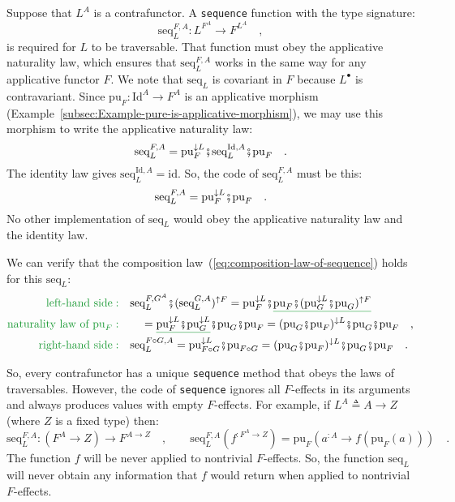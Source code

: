 Suppose that $L^{A}$ is a contrafunctor. A \lstinline!sequence!
function with the type signature:
\[
\text{seq}_{L}^{F,A}:L^{F^{A}}\rightarrow F^{L^{A}}\quad,
\]
is required for $L$ to be traversable. That function must obey the
applicative naturality law, which ensures that $\text{seq}_{L}^{F,A}$
works in the same way for any applicative functor $F$. We note that
$\text{seq}_{L}$ is covariant in $F$ because $L^{\bullet}$ is contravariant.
Since $\text{pu}_{F}:\text{Id}^{A}\rightarrow F^{A}$ is an applicative
morphism (Example~\ref{subsec:Example-pure-is-applicative-morphism}),
we may use this morphism to write the applicative naturality law:
\[
\text{seq}_{L}^{F,A}=\text{pu}_{F}^{\downarrow L}\bef\text{seq}_{L}^{\text{Id},A}\bef\text{pu}_{F}\quad.
\]
The identity law gives $\text{seq}_{L}^{\text{Id},A}=\text{id}$.
So, the code of $\text{seq}_{L}^{F,A}$ must be this:
\[
\text{seq}_{L}^{F,A}=\text{pu}_{F}^{\downarrow L}\bef\text{pu}_{F}\quad.
\]
No other implementation of $\text{seq}_{L}$ would obey the applicative
naturality law and the identity law.

We can verify that the composition law~(\ref{eq:composition-law-of-sequence})
holds for this $\text{seq}_{L}$:
\begin{align*}
{\color{greenunder}\text{left-hand side}:}\quad & \text{seq}_{L}^{F,G^{A}}\bef(\text{seq}_{L}^{G,A})^{\uparrow F}=\text{pu}_{F}^{\downarrow L}\bef\gunderline{\text{pu}_{F}\bef(\text{pu}_{G}^{\downarrow L}\bef\text{pu}_{G})^{\uparrow F}}\\
{\color{greenunder}\text{naturality law of }\text{pu}_{F}:}\quad & \quad=\gunderline{\text{pu}_{F}^{\downarrow L}\bef\text{pu}_{G}^{\downarrow L}}\bef\text{pu}_{G}\bef\text{pu}_{F}=(\text{pu}_{G}\bef\text{pu}_{F})^{\downarrow L}\bef\text{pu}_{G}\bef\text{pu}_{F}\quad,\\
{\color{greenunder}\text{right-hand side}:}\quad & \text{seq}_{L}^{F\circ G,A}=\text{pu}_{F\circ G}^{\downarrow L}\bef\text{pu}_{F\circ G}=(\text{pu}_{G}\bef\text{pu}_{F})^{\downarrow L}\bef\text{pu}_{G}\bef\text{pu}_{F}\quad.
\end{align*}

So, every contrafunctor has a unique \lstinline!sequence! method
that obeys the laws of traversables. However, the code of \lstinline!sequence!
ignores all $F$-effects in its arguments and always produces values
with empty $F$-effects. For example, if $L^{A}\triangleq A\rightarrow Z$
(where $Z$ is a fixed type) then:
\[
\text{seq}_{L}^{F,A}:(F^{A}\rightarrow Z)\rightarrow F^{A\rightarrow Z}\quad,\quad\quad\text{seq}_{L}^{F,A}(f^{:F^{A}\rightarrow Z})=\text{pu}_{F}(a^{:A}\rightarrow f(\text{pu}_{F}(a)))\quad.
\]
The function $f$ will be never applied to nontrivial $F$-effects.
So, the function $\text{seq}_{L}$ will never obtain any information
that $f$ would return when applied to nontrivial $F$-effects. 

